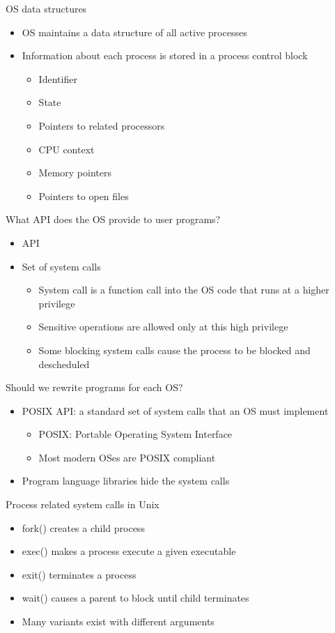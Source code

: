 \documentclass[12pt]{article}
\begin{document}
OS data structures
\begin{itemize}
    \item OS maintains a data structure of all active processes
    \item Information about each process is stored in a process control block
    \begin{itemize}
        \item Identifier
        \item State
        \item Pointers to related processors
        \item CPU context
        \item Memory pointers
        \item Pointers to open files
    \end{itemize}
\end{itemize}

What API does the OS provide to user programs?
\begin{itemize}
    \item API
    \item Set of system calls
    \begin{itemize}
        \item System call is a function call into the OS code that runs at a higher privilege
        \item Sensitive operations are allowed only at this high privilege
        \item Some blocking system calls cause the process to be blocked and descheduled
    \end{itemize}
\end{itemize}

Should we rewrite programs for each OS?
\begin{itemize}
    \item POSIX API: a standard set of system calls that an OS must implement
    \begin{itemize}
        \item POSIX: Portable Operating System Interface
        \item Most modern OSes are POSIX compliant
    \end{itemize}
    \item Program language libraries hide the system calls
\end{itemize}

Process related system calls in Unix
\begin{itemize}
    \item fork() creates a child process
    \item exec() makes a process execute a given executable
    \item exit() terminates a process
    \item wait() causes a parent to block until child terminates
    \item Many variants exist with different arguments
\end{itemize}
\end{document}
